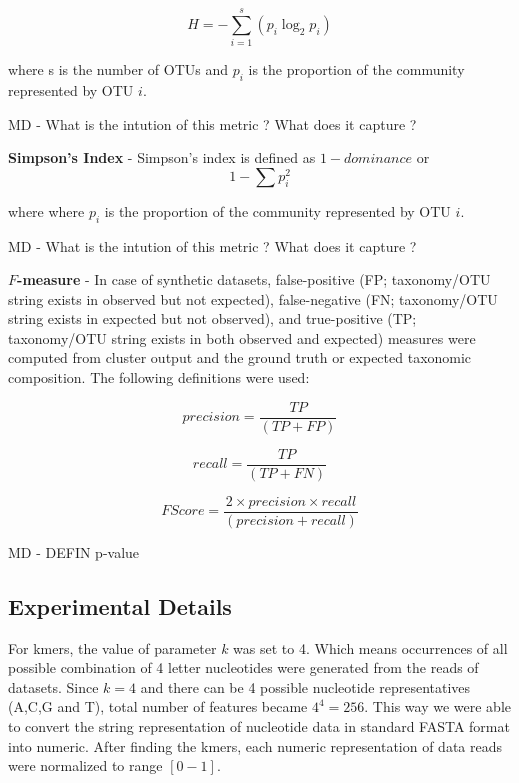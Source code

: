 \documentclass[10pt, conference, compsocconf]{IEEEtran}
\begin{document}
\begin{equation}
H={-} \sum_{i=1}^{s} \left( p_i\log_2p_i \right)
\end{equation}

where s is the number of OTUs and $p_i$ is the proportion of the community represented by OTU $i$.

MD - What is the intution of this metric ? What does it capture ? 

\hspace*{4mm}\textbf{Simpson's Index} - Simpson’s index is defined as ${1-dominance}$ or
\begin{equation}
1 - \sum p_i^2
\end{equation}

where where $p_i$ is the proportion of the community represented by OTU $i$.

MD - What is the intution of this metric ? What does it capture ? 

\hspace*{4mm}\textbf{$F$-measure} - In case of 
synthetic datasets, false-positive (FP; taxonomy/OTU string 
exists in observed but not expected), false-negative
(FN; taxonomy/OTU string exists in expected but not observed), and 
true-positive (TP; taxonomy/OTU string exists in both observed and expected) measures were computed from 
cluster output and the ground truth or expected taxonomic composition. The following definitions were used:

\begin{equation}
precision = \frac{TP}{(TP + FP)}
\end{equation}

\begin{equation}
recall = \frac{TP}{(TP + FN)}
\end{equation}

\begin{equation}
F Score = \frac{2 \times precision \times recall}{(precision + recall)}
\end{equation}

MD - DEFIN p-value %
\subsection{Experimental Details}

For kmers, the value of parameter $k$ was set to 4. Which means occurrences of
all possible combination of 4 letter nucleotides were generated
from the reads of datasets. Since $k=4$ and there can be 4 possible nucleotide representatives (A,C,G and T), total number of features became $4^4=256$. This way we were able to convert the string representation of nucleotide data in standard FASTA format into numeric. After finding the kmers, each numeric representation of data reads were normalized to range $\left[0-1\right]$.
\end{document}
